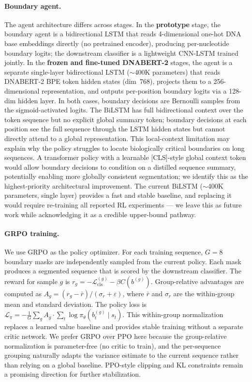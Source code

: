 \documentclass[sigconf,screen]{acmart}
\newcommand{\dnabert}{DNABERT-2\xspace}
\begin{document}
\paragraph{Boundary agent.}
The agent architecture differs across stages. In the \textbf{prototype} stage, the boundary agent is a bidirectional LSTM \cite{hochreiter1997long} that reads 4-dimensional one-hot DNA base embeddings directly (no pretrained encoder), producing per-nucleotide boundary logits; the downstream classifier is a lightweight CNN-LSTM trained jointly. In the \textbf{frozen and fine-tuned \dnabert} stages, the agent is a separate single-layer bidirectional LSTM ($\sim$400K parameters) that reads \dnabert BPE token hidden states (dim~768), projects them to a 256-dimensional representation, and outputs per-position boundary logits via a 128-dim hidden layer. In both cases, boundary decisions are Bernoulli samples from the sigmoid-activated logits. The BiLSTM has full bidirectional context over the token sequence but no explicit global summary token; boundary decisions at each position see the full sequence through the LSTM hidden states but cannot directly attend to a global representation. This local-context limitation may explain why the policy struggles to locate biologically critical boundaries on long sequences. A transformer policy with a learnable [CLS]-style global context token would allow boundary decisions to condition on a distilled sequence summary, potentially enabling more globally consistent segmentation; we identify this as the highest-priority architectural improvement. The current BiLSTM ($\sim$400K parameters, single layer) provides a fast and stable baseline, and replacing it would require re-training all reported RL experiments — we leave this as future work while acknowledging it as a credible upper-bound pathway.

\paragraph{GRPO training.}
We use GRPO \cite{shao2024deepseekmath} as the policy optimizer. For each training sequence, $G=8$ boundary masks are independently sampled from the current policy. Each mask produces a segmented sequence that is scored by the downstream classifier. The reward for sample $g$ is $r_g = -\mathcal{L}_{\mathrm{cls}}^{(g)} - \beta C(b^{(g)})$. Group-relative advantages are computed as $A_g = (r_g - \bar{r}) / (\sigma_r + \varepsilon)$, where $\bar{r}$ and $\sigma_r$ are the within-group mean and standard deviation. The policy loss is $\mathcal{L}_\pi = -\frac{1}{G}\sum_g A_g \cdot \sum_t \log \pi_\theta(b_t^{(g)} \mid s_t)$. This within-group normalization replaces a learned value baseline and provides stable training without a separate critic network. We prefer GRPO over PPO \cite{schulman2017proximal} here because the group-relative normalization is parameter-free (no critic to train), and the per-sequence grouping naturally adapts the variance estimate to the current sequence rather than relying on a global baseline. PPO-style clipping and KL constraints remain a promising direction for further stabilization.
\end{document}
